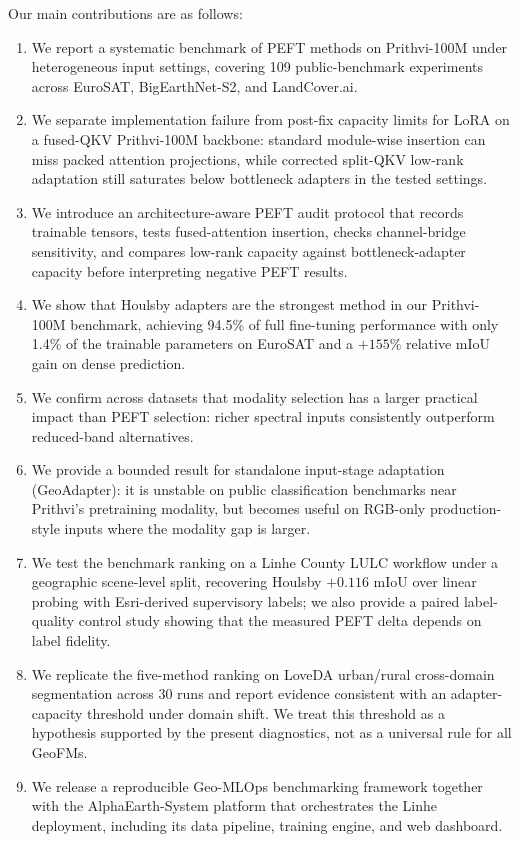 Our main contributions are as follows:
\begin{enumerate}[leftmargin=1.5em]
    \item We report a systematic benchmark of PEFT methods on Prithvi-100M under heterogeneous input settings, covering 109 public-benchmark experiments across EuroSAT, BigEarthNet-S2, and LandCover.ai.
    \item We separate implementation failure from post-fix capacity limits for LoRA on a fused-QKV Prithvi-100M backbone: standard module-wise insertion can miss packed attention projections, while corrected split-QKV low-rank adaptation still saturates below bottleneck adapters in the tested settings.
    \item We introduce an architecture-aware PEFT audit protocol that records trainable tensors, tests fused-attention insertion, checks channel-bridge sensitivity, and compares low-rank capacity against bottleneck-adapter capacity before interpreting negative PEFT results.
    \item We show that Houlsby adapters are the strongest method in our Prithvi-100M benchmark, achieving 94.5\% of full fine-tuning performance with only 1.4\% of the trainable parameters on EuroSAT and a $+155\%$ relative mIoU gain on dense prediction.
    \item We confirm across datasets that modality selection has a larger practical impact than PEFT selection: richer spectral inputs consistently outperform reduced-band alternatives.
    \item We provide a bounded result for standalone input-stage adaptation (GeoAdapter): it is unstable on public classification benchmarks near Prithvi's pretraining modality, but becomes useful on RGB-only production-style inputs where the modality gap is larger.
    \item We test the benchmark ranking on a Linhe County LULC workflow under a geographic scene-level split, recovering Houlsby $+0.116$ mIoU over linear probing with Esri-derived supervisory labels; we also provide a paired label-quality control study showing that the measured PEFT delta depends on label fidelity.
    \item We replicate the five-method ranking on LoveDA urban/rural cross-domain segmentation across 30 runs and report evidence consistent with an adapter-capacity threshold under domain shift. We treat this threshold as a hypothesis supported by the present diagnostics, not as a universal rule for all GeoFMs.
    \item We release a reproducible Geo-MLOps benchmarking framework together with the AlphaEarth-System platform that orchestrates the Linhe deployment, including its data pipeline, training engine, and web dashboard.
\end{enumerate}
